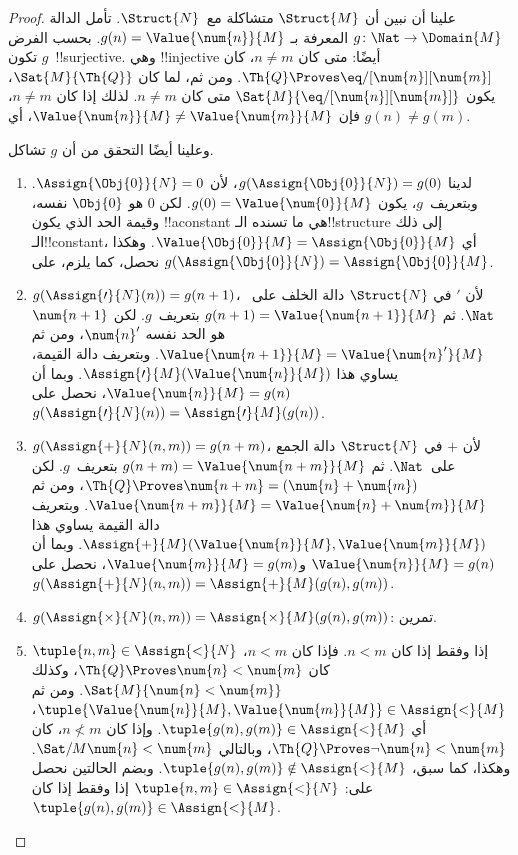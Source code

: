 \documentclass[../../../include/open-logic-section]{subfiles}
\begin{document}
\begin{proof}
علينا أن نبين أن $\Struct{M}$ متشاكلة مع~$\Struct{N}$. تأمل الدالة
$g\colon \Nat \to \Domain{M}$ المعرفة بـ
$g(n)=\Value{\num{n}}{M}$. بحسب الفرض تكون $g$~!!{surjective}.
وهي !!{injective} أيضًا: متى كان $n \neq m$، كان
$\Th{Q} \Proves \eq/[\num{n}][\num{m}]$. ومن ثم، لما كان
$\Sat{M}{\Th{Q}}$، يكون $\Sat{M}{\eq/[\num{n}][\num{m}]}$ متى كان
$n \neq m$. لذلك إذا كان $n \neq m$، فإن
$\Value{\num{n}}{M} \neq \Value{\num{m}}{M}$، أي $g(n) \neq g(m)$.

وعلينا أيضًا التحقق من أن $g$ تشاكل.
\begin{enumerate}
\item لدينا $g(\Assign{\Obj{0}}{N})=g(0)$، لأن
  $\Assign{\Obj{0}}{N}=0$. وبتعريف~$g$، يكون
  $g(0)=\Value{\num{0}}{M}$. لكن $\num{0}$ هو $\Obj{0}$ نفسه، وقيمة
  الحد الذي يكون !!a{constant} هي ما تسنده الـ!!{structure} إلى ذلك
  الـ!!{constant}، أي
  $\Value{\Obj{0}}{M}=\Assign{\Obj{0}}{M}$. وهكذا نحصل، كما يلزم، على
  $g(\Assign{\Obj{0}}{N})=\Assign{\Obj{0}}{M}$.
\item $g(\Assign{\prime}{N}(n))=g(n+1)$، لأن $\prime$ في
  $\Struct{N}$ دالة الخلف على~$\Nat$. ثم
  $g(n+1)=\Value{\num{n+1}}{M}$ بتعريف~$g$. لكن $\num{n+1}$ هو الحد
  نفسه $\num{n}'$، ومن ثم
  $\Value{\num{n+1}}{M}=\Value{\num{n}'}{M}$. وبتعريف دالة القيمة،
  يساوي هذا $\Assign{\prime}{M}(\Value{\num{n}}{M})$. وبما أن
  $\Value{\num{n}}{M}=g(n)$، نحصل على
  $g(\Assign{\prime}{N}(n))=\Assign{\prime}{M}(g(n))$.
\item $g(\Assign{+}{N}(n,m))=g(n+m)$، لأن $+$ في $\Struct{N}$ دالة
  الجمع على~$\Nat$. ثم $g(n+m)=\Value{\num{n+m}}{M}$ بتعريف~$g$.
  لكن $\Th{Q} \Proves \num{n+m} = (\num{n} + \num{m})$، ومن ثم
  $\Value{\num{n+m}}{M}=\Value{\num{n}+\num{m}}{M}$. وبتعريف دالة
  القيمة يساوي هذا
  $\Assign{+}{M}(\Value{\num{n}}{M},\Value{\num{m}}{M})$. وبما أن
  $\Value{\num{n}}{M}=g(n)$ و$\Value{\num{m}}{M}=g(m)$، نحصل على
  $g(\Assign{+}{N}(n,m))=\Assign{+}{M}(g(n),g(m))$.
\item $g(\Assign{\times}{N}(n, m)) = \Assign{\times}{M}(g(n), g(m))$:
  تمرين.
\item $\tuple{n,m} \in \Assign{<}{N}$ إذا وفقط إذا كان $n<m$. فإذا
  كان $n<m$، كان $\Th{Q} \Proves \num{n} < \num{m}$، وكذلك
  $\Sat{M}{\num{n} < \num{m}}$. ومن ثم
  $\tuple{\Value{\num{n}}{M},\Value{\num{m}}{M}} \in \Assign{<}{M}$،
  أي $\tuple{g(n),g(m)} \in \Assign{<}{M}$. وإذا كان $n \not< m$، كان
  $\Th{Q} \Proves \lnot \num{n} < \num{m}$، وبالتالي
  $\Sat/{M}{\num{n} < \num{m}}$. وهكذا، كما سبق،
  $\tuple{g(n),g(m)} \notin \Assign{<}{M}$. وبضم الحالتين نحصل على:
  $\tuple{n,m} \in \Assign{<}{N}$ إذا وفقط إذا كان
  $\tuple{g(n),g(m)} \in \Assign{<}{M}$.
\end{enumerate}
\end{proof}
\end{document}

